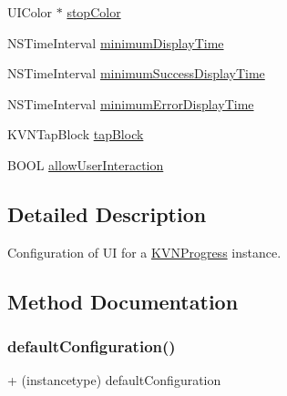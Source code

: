 \begin{DoxyCompactItemize}
\item 
U\+I\+Color $\ast$ \mbox{\hyperlink{interface_k_v_n_progress_configuration_a8a00659c41960b9939804a39fc7127ce}{stop\+Color}}
\item 
N\+S\+Time\+Interval \mbox{\hyperlink{interface_k_v_n_progress_configuration_a382ab489edf0fcff63220d9fc036798c}{minimum\+Display\+Time}}
\item 
N\+S\+Time\+Interval \mbox{\hyperlink{interface_k_v_n_progress_configuration_a1336fc0be3866b6129387718e9ce9cc6}{minimum\+Success\+Display\+Time}}
\item 
N\+S\+Time\+Interval \mbox{\hyperlink{interface_k_v_n_progress_configuration_a412ec7fec171797c4c0ce7a0e796f439}{minimum\+Error\+Display\+Time}}
\item 
K\+V\+N\+Tap\+Block \mbox{\hyperlink{interface_k_v_n_progress_configuration_a90c8c76e53b5a62210126e6ba0f233a8}{tap\+Block}}
\item 
B\+O\+OL \mbox{\hyperlink{interface_k_v_n_progress_configuration_a12b6a36b702af3d664d8d3a3dc94fca6}{allow\+User\+Interaction}}
\end{DoxyCompactItemize}


\subsection{Detailed Description}
Configuration of UI for a {\ttfamily \mbox{\hyperlink{interface_k_v_n_progress}{K\+V\+N\+Progress}}} instance. 

\subsection{Method Documentation}
\mbox{\label{interface_k_v_n_progress_configuration_ac66fdbe5c485d14e39ac25a1b89a901f}} 
\subsubsection{\texorpdfstring{default\+Configuration()}{defaultConfiguration()}\hspace{0.1cm}{\footnotesize\ttfamily [1/3]}}
{\footnotesize\ttfamily + (instancetype) default\+Configuration \begin{DoxyParamCaption}{ }\end{DoxyParamCaption}}

